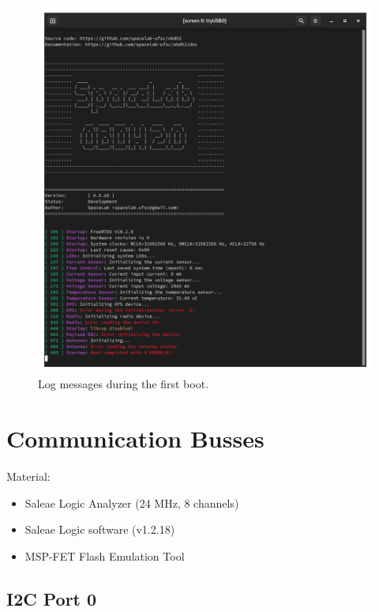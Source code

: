 \begin{figure}[!ht]
    \begin{center}
        \includegraphics[width=0.8\columnwidth]{figures/v05/log-first-boot.png}
        \caption{Log messages during the first boot.}
        \label{fig:log-first-boot}
    \end{center}
\end{figure}

\section{Communication Busses}

Material:

\begin{itemize}
    \item Saleae Logic Analyzer (24 MHz, 8 channels)
    \item Saleae Logic software (v1.2.18)
    \item MSP-FET Flash Emulation Tool
\end{itemize}

\subsection{I2C Port 0}

